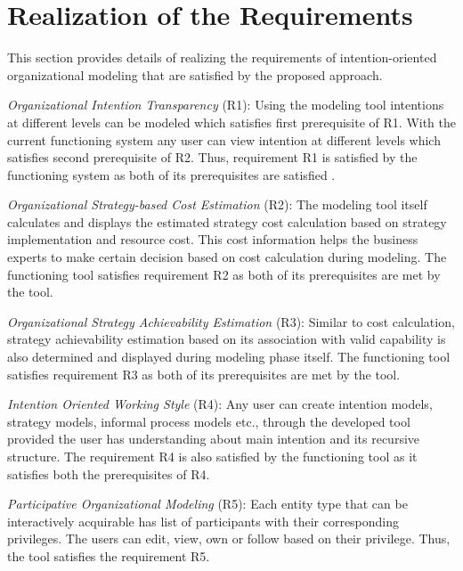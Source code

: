 		
\section{Realization of the Requirements}
\label{sec:validation}
This section provides details of realizing the requirements of intention-oriented organizational modeling that are satisfied by the proposed approach. 

\textit{Organizational Intention Transparency} (R1):  Using the modeling tool intentions at different levels can be modeled which satisfies first prerequisite of R1. With the current functioning system any user can view intention at different levels which satisfies second prerequisite of R2. Thus, requirement R1 is satisfied by the functioning system as both of its prerequisites are satisfied .

\textit{Organizational Strategy-based Cost Estimation} (R2): The modeling tool itself calculates and displays the estimated strategy cost calculation based on strategy implementation and resource cost. This cost information helps the business experts to make certain decision based on cost calculation during modeling. The functioning tool satisfies requirement R2 as both of its prerequisites are met by the tool. 

\textit{Organizational Strategy Achievability Estimation} (R3): Similar to cost calculation, strategy achievability estimation based on its association with valid capability is also determined and displayed during modeling phase itself. The functioning tool satisfies requirement R3 as both of its prerequisites are met by the tool.

\textit{Intention Oriented Working Style} (R4): Any user can create intention models, strategy models, informal process models etc., through the developed tool provided the user has understanding about main intention and its recursive structure. The requirement R4 is also satisfied by the functioning tool as it satisfies both the prerequisites of R4.

\textit{Participative Organizational Modeling} (R5): Each entity type that can be interactively acquirable has list of participants with their corresponding privileges. The users can edit, view, own or follow based on their privilege. Thus, the tool satisfies the requirement R5.

